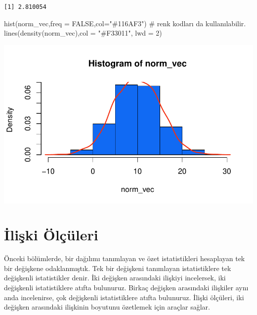 \documentclass[
  letterpaper,
  DIV=11,
  numbers=noendperiod]{scrreprt}
\newenvironment{Shaded}{\begin{snugshade}}{\end{snugshade}}
\newcommand{\AttributeTok}[1]{\textcolor[rgb]{0.40,0.45,0.13}{#1}}
\newcommand{\CommentTok}[1]{\textcolor[rgb]{0.37,0.37,0.37}{#1}}
\newcommand{\ConstantTok}[1]{\textcolor[rgb]{0.56,0.35,0.01}{#1}}
\newcommand{\DecValTok}[1]{\textcolor[rgb]{0.68,0.00,0.00}{#1}}
\newcommand{\FunctionTok}[1]{\textcolor[rgb]{0.28,0.35,0.67}{#1}}
\newcommand{\NormalTok}[1]{\textcolor[rgb]{0.00,0.23,0.31}{#1}}
\newcommand{\StringTok}[1]{\textcolor[rgb]{0.13,0.47,0.30}{#1}}
\begin{document}
\begin{verbatim}
[1] 2.810054
\end{verbatim}

\begin{Shaded}
\begin{Highlighting}[]
\FunctionTok{hist}\NormalTok{(norm\_vec,}\AttributeTok{freq =} \ConstantTok{FALSE}\NormalTok{,}\AttributeTok{col=}\StringTok{"\#116AF3"}\NormalTok{) }\CommentTok{\# renk kodları da kullanılabilir.}
\FunctionTok{lines}\NormalTok{(}\FunctionTok{density}\NormalTok{(norm\_vec),}\AttributeTok{col =} \StringTok{"\#F33011"}\NormalTok{, }\AttributeTok{lwd =} \DecValTok{2}\NormalTok{)}
\end{Highlighting}
\end{Shaded}

\includegraphics{statistics_files/figure-pdf/unnamed-chunk-10-3.pdf}

\section*{İlişki Ölçüleri}\label{iliux15fki-uxf6luxe7uxfcleri}


Önceki bölümlerde, bir dağılımı tanımlayan ve özet istatistikleri
hesaplayan tek bir değişkene odaklanmıştık. Tek bir değişkeni tanımlayan
istatistiklere tek değişkenli istatistikler denir. İki değişken
arasındaki ilişkiyi incelersek, iki değişkenli istatistiklere atıfta
bulunuruz. Birkaç değişken arasındaki ilişkiler aynı anda incelenirse,
çok değişkenli istatistiklere atıfta bulunuruz. İlişki ölçüleri, iki
değişken arasındaki ilişkinin boyutunu özetlemek için araçlar sağlar.
\end{document}
